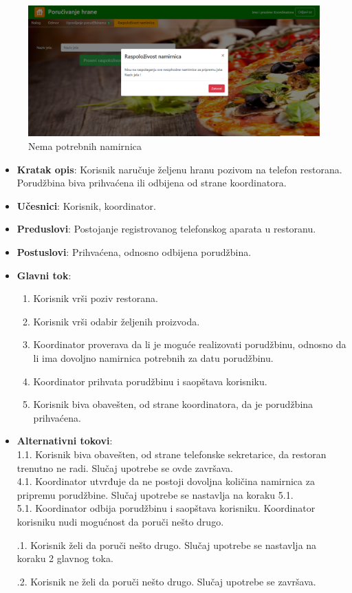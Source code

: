 \begin{figure}[!h]
    \includegraphics[width=1\textwidth]{slike/nedovoljno_namirnica.png}
    \caption{Nema potrebnih namirnica} %
    \label{fig:slika_kontakt}
\end{figure}
\begin{itemize}
    \item \textbf{Kratak opis}: Korisnik naručuje željenu hranu pozivom na telefon restorana. Porudžbina biva prihvaćena ili odbijena od strane koordinatora.
    \item \textbf{Učesnici}: Korisnik, koordinator.
    \item \textbf{Preduslovi}: Postojanje registrovanog telefonskog aparata u restoranu.
    \item \textbf{Postuslovi}: Prihvaćena, odnosno odbijena porudžbina.
     \item \textbf{Glavni tok}:
    \begin{enumerate}
        \item Korisnik vrši poziv restorana.
        \item Korisnik vrši odabir željenih proizvoda.
        \item Koordinator proverava da li je moguće realizovati porudžbinu, odnosno
        da li ima dovoljno namirnica potrebnih za datu porudžbinu.
        \item Koordinator prihvata porudžbinu i saopštava korisniku.
        \item Korisnik biva obavešten, od strane koordinatora, da je porudžbina prihvaćena.
    \end{enumerate}
    \item \textbf{Alternativni tokovi}:\\
     1.1. Korisnik biva obavešten, od strane telefonske sekretarice, da restoran trenutno ne radi. Slučaj upotrebe se ovde završava.\\
     4.1. Koordinator utvrđuje da ne postoji dovoljna količina namirnica za pripremu porudžbine. Slučaj upotrebe se nastavlja na koraku 5.1.\\
     5.1. Koordinator odbija porudžbinu i saopštava korisniku. Koordinator korisniku nudi mogućnost da poruči nešto drugo.  
     
      .1. Korisnik želi da poruči nešto drugo. Slučaj upotrebe se nastavlja na koraku 2 glavnog toka. 
      
      .2. Korisnik ne želi da poruči nešto drugo. Slučaj upotrebe se završava. \\
    
    \end{itemize}
